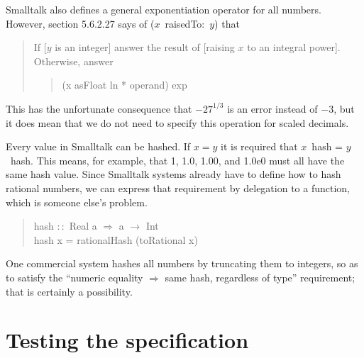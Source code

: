 \documentclass[prodmode,acmtoplas]{acmsmall}
\begin{document}
Smalltalk also defines a general exponentiation operator for all numbers.
However, section 5.6.2.27 says of ($x$~raisedTo:~$y$) that
\begin{quote}
If [$y$ is an integer] answer the result of [raising $x$ to an
integral power]. Otherwise, answer
\begin{quote}
\begin{tabbing}
\sffamily (x asFloat ln * operand) exp
\end{tabbing}
\end{quote}
\end{quote}
This has the unfortunate consequence that $-27^{1/3}$ is an error
instead of $-3$, but it does mean that we do not need to specify this
operation for scaled decimals.

Every value in Smalltalk can be hashed.  If $x = y$ it is required
that $x$~hash = $y$~hash.  This means, for example,
that 1, 1.0, 1.00, and 1.0e0 must all have the same hash value.
Since Smalltalk systems already have to define how to hash rational
numbers, we can express that requirement by delegation to a
 function, which is someone else's problem.
\begin{quote}
\begin{tabbing}
\sffamily hash $::$ Real a $\Rightarrow$ a $\rightarrow$ Int\\
\sffamily hash x = rationalHash (toRational x)
\end{tabbing}
\end{quote}
One commercial system hashes all numbers by truncating them to integers,
so as to satisfy the ``numeric equality $\Rightarrow$ same hash,
regardless of type'' requirement; that is certainly a possibility.

\section{Testing the specification}
\end{document}

